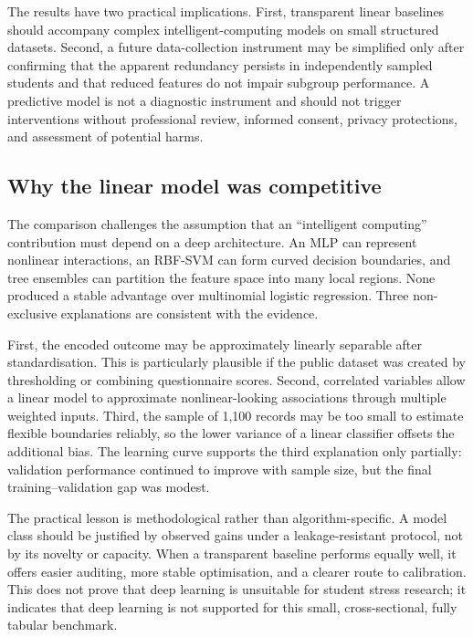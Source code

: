 \documentclass[review]{elsarticle}
\begin{document}
The results have two practical implications. First, transparent linear baselines should accompany complex intelligent-computing models on small structured datasets. Second, a future data-collection instrument may be simplified only after confirming that the apparent redundancy persists in independently sampled students and that reduced features do not impair subgroup performance. A predictive model is not a diagnostic instrument and should not trigger interventions without professional review, informed consent, privacy protections, and assessment of potential harms.

\subsection{Why the linear model was competitive}
The comparison challenges the assumption that an ``intelligent computing'' contribution must depend on a deep architecture. An MLP can represent nonlinear interactions, an RBF-SVM can form curved decision boundaries, and tree ensembles can partition the feature space into many local regions. None produced a stable advantage over multinomial logistic regression. Three non-exclusive explanations are consistent with the evidence.

First, the encoded outcome may be approximately linearly separable after standardisation. This is particularly plausible if the public dataset was created by thresholding or combining questionnaire scores. Second, correlated variables allow a linear model to approximate nonlinear-looking associations through multiple weighted inputs. Third, the sample of 1,100 records may be too small to estimate flexible boundaries reliably, so the lower variance of a linear classifier offsets the additional bias. The learning curve supports the third explanation only partially: validation performance continued to improve with sample size, but the final training--validation gap was modest.

The practical lesson is methodological rather than algorithm-specific. A model class should be justified by observed gains under a leakage-resistant protocol, not by its novelty or capacity. When a transparent baseline performs equally well, it offers easier auditing, more stable optimisation, and a clearer route to calibration. This does not prove that deep learning is unsuitable for student stress research; it indicates that deep learning is not supported for this small, cross-sectional, fully tabular benchmark.
\end{document}
